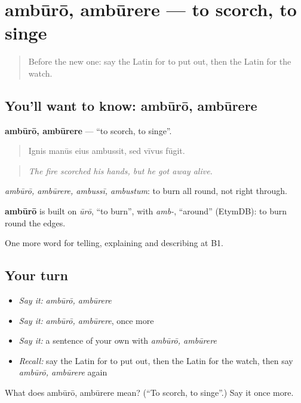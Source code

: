 \section[ambūrō, ambūrere]{ambūrō, ambūrere — to scorch, to singe}

\label{lesson:LA-C319-amburo}



\begin{quote}
Before the new one: say the Latin for to put out, then the Latin for the watch.
\end{quote}

\subsection*{You'll want to know: ambūrō, ambūrere}
\textbf{ambūrō, ambūrere} — \textquotedblleft{}to scorch, to singe\textquotedblright{}.

\begin{quote}
Ignis manūs eius ambussit, sed vīvus fūgit.
\end{quote}

\begin{quote}
\emph{The fire scorched his hands, but he got away alive.}
\end{quote}

\emph{ambūrō, ambūrere, ambussī, ambustum}: to burn all round, not right through.

\begin{cousinweb}
\textbf{ambūrō} is built on \emph{ūrō}, \textquotedblleft{}to burn\textquotedblright{}, with \emph{amb-}, \textquotedblleft{}around\textquotedblright{} (EtymDB): to burn round the edges.
\end{cousinweb}

\begin{grammarlens}[title={What you've built}]
One more word for telling, explaining and describing at B1.
\end{grammarlens}

\subsection*{Your turn}
\begin{itemize}
\raggedright
  \item \emph{Say it:} \emph{ambūrō, ambūrere}
  \item \emph{Say it:} \emph{ambūrō, ambūrere}, once more
  \item \emph{Say it:} a sentence of your own with \emph{ambūrō, ambūrere}
  \item \emph{Recall:} say the Latin for to put out, then the Latin for the watch, then say \emph{ambūrō, ambūrere} again
\end{itemize}

\begin{tcolorbox}[breakable,colback=teal!4,colframe=teal!35!black,title={Before you move on}]
What does ambūrō, ambūrere mean? (\textquotedblleft{}To scorch, to singe\textquotedblright{}.) Say it once more.
\end{tcolorbox}
